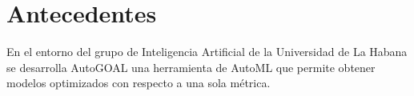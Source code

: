 








\section*{Antecedentes}
En el entorno del grupo de Inteligencia Artificial de la Universidad de La Habana se desarrolla AutoGOAL una herramienta de AutoML que permite obtener modelos optimizados con respecto a una sola m\'etrica.

